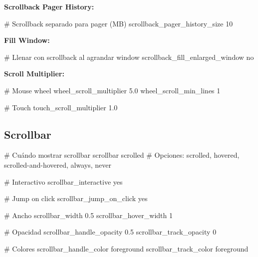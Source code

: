 \documentclass[
  doc,
  floatsintext,
  longtable,
  a4paper,
  nolmodern,
  notxfonts,
  notimes,
  12pt,
  colorlinks=true,linkcolor=blue,citecolor=blue,urlcolor=blue]{apa7}
\newenvironment{Shaded}{\begin{snugshade}}{\end{snugshade}}
\newcommand{\CommentTok}[1]{\textcolor[rgb]{0.37,0.37,0.37}{#1}}
\newcommand{\DataTypeTok}[1]{\textcolor[rgb]{0.68,0.00,0.00}{#1}}
\begin{document}
\textbf{Scrollback Pager History:}

\begin{Shaded}
\begin{Highlighting}[]
\CommentTok{\# Scrollback separado para pager (MB)}
\DataTypeTok{scrollback\_pager\_history\_size} \DataTypeTok{10}
\end{Highlighting}
\end{Shaded}

\textbf{Fill Window:}

\begin{Shaded}
\begin{Highlighting}[]
\CommentTok{\# Llenar con scrollback al agrandar window}
\DataTypeTok{scrollback\_fill\_enlarged\_window} \DataTypeTok{no}
\end{Highlighting}
\end{Shaded}

\textbf{Scroll Multiplier:}

\begin{Shaded}
\begin{Highlighting}[]
\CommentTok{\# Mouse wheel}
\DataTypeTok{wheel\_scroll\_multiplier} \DataTypeTok{5.0}
\DataTypeTok{wheel\_scroll\_min\_lines} \DataTypeTok{1}

\CommentTok{\# Touch}
\DataTypeTok{touch\_scroll\_multiplier} \DataTypeTok{1.0}
\end{Highlighting}
\end{Shaded}

\subsection{Scrollbar}\label{scrollbar}

\begin{Shaded}
\begin{Highlighting}[]
\CommentTok{\# Cuándo mostrar scrollbar}
\DataTypeTok{scrollbar} \DataTypeTok{scrolled}
\CommentTok{\# Opciones: scrolled, hovered, scrolled{-}and{-}hovered, always, never}

\CommentTok{\# Interactivo}
\DataTypeTok{scrollbar\_interactive} \DataTypeTok{yes}

\CommentTok{\# Jump on click}
\DataTypeTok{scrollbar\_jump\_on\_click} \DataTypeTok{yes}

\CommentTok{\# Ancho}
\DataTypeTok{scrollbar\_width} \DataTypeTok{0.5}
\DataTypeTok{scrollbar\_hover\_width} \DataTypeTok{1}

\CommentTok{\# Opacidad}
\DataTypeTok{scrollbar\_handle\_opacity} \DataTypeTok{0.5}
\DataTypeTok{scrollbar\_track\_opacity} \DataTypeTok{0}

\CommentTok{\# Colores}
\DataTypeTok{scrollbar\_handle\_color} \DataTypeTok{foreground}
\DataTypeTok{scrollbar\_track\_color} \DataTypeTok{foreground}
\end{Highlighting}
\end{Shaded}
\end{document}
